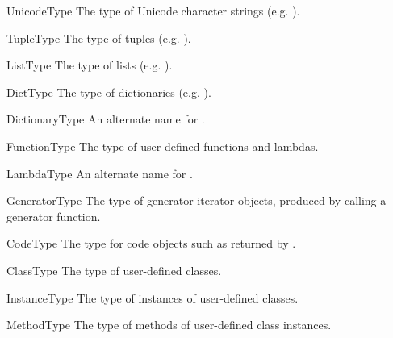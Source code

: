 \begin{datadesc}{UnicodeType}
The type of Unicode character strings (e.g. ).
\end{datadesc}

\begin{datadesc}{TupleType}
The type of tuples (e.g. ).
\end{datadesc}

\begin{datadesc}{ListType}
The type of lists (e.g. \code{[0, 1, 2, 3]}).
\end{datadesc}

\begin{datadesc}{DictType}
The type of dictionaries (e.g. ).
\end{datadesc}

\begin{datadesc}{DictionaryType}
An alternate name for .
\end{datadesc}

\begin{datadesc}{FunctionType}
The type of user-defined functions and lambdas.
\end{datadesc}

\begin{datadesc}{LambdaType}
An alternate name for .
\end{datadesc}

\begin{datadesc}{GeneratorType}
The type of generator-iterator objects, produced by calling a
generator function.
\end{datadesc}

\begin{datadesc}{CodeType}
The type for code objects such as returned by
.
\end{datadesc}

\begin{datadesc}{ClassType}
The type of user-defined classes.
\end{datadesc}

\begin{datadesc}{InstanceType}
The type of instances of user-defined classes.
\end{datadesc}

\begin{datadesc}{MethodType}
The type of methods of user-defined class instances.
\end{datadesc}

